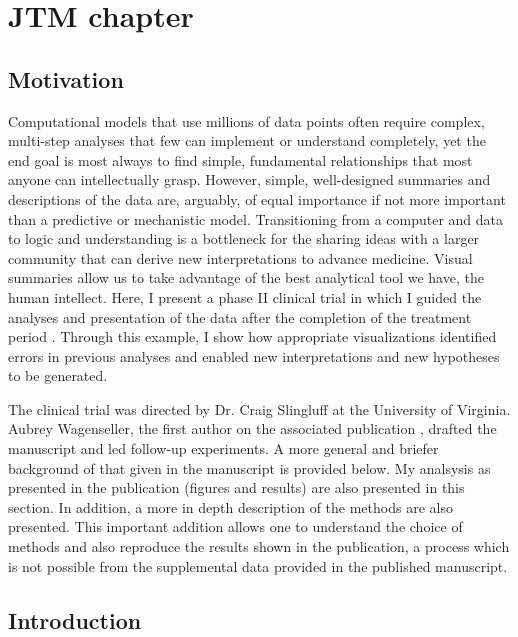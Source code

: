 
\chapter{ JTM chapter }

\section{Motivation}

Computational models that use millions of data points
often require complex, multi-step analyses that few can implement or understand completely, 
yet the end goal is most always 
to find simple, fundamental relationships
that most anyone can intellectually grasp. However, simple, well-designed
summaries and descriptions of the data are, arguably, of equal importance if not
more important than a predictive or mechanistic model.
Transitioning from a computer and data to logic and understanding is a
bottleneck for the sharing ideas with a larger community
that can derive new interpretations to advance medicine.
Visual summaries allow us to take advantage of the best
analytical tool we have, the human intellect.
Here, I present a phase II
clinical trial in which I guided the analyses and presentation of the data
after the completion of the treatment period \cite{Wagenseller:2013fj}.
Through this example, I show how appropriate visualizations identified
errors in previous analyses and enabled new interpretations and new
hypotheses to be generated.

The clinical trial was directed by Dr. Craig Slingluff at the
University of Virginia. Aubrey Wagenseller, the first author on the associated
publication \cite{Wagenseller:2013fj}, drafted the manuscript 
and led follow-up experiments. A more general and briefer background
of that given in the manuscript is provided below. My analsysis as presented
in the publication (figures and results) are also presented in this section. 
In addition, a more in depth description of the
methods are also presented. This important addition allows one to understand
the choice of methods and also reproduce
the results shown in the publication, a process which is not possible from the
supplemental data provided in the published manuscript.

\section{Introduction}

